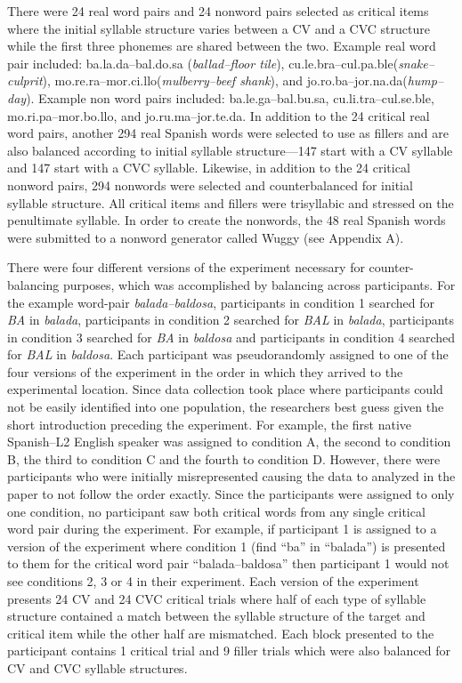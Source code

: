 \documentclass[
12pt, %
english, %
doublespacing, %
nolistspacing, %
liststotoc, %
headsepline, %
chapterinoneline, %
openany, %
]{DoctoralThesis}\usepackage[]{graphicx}\usepackage[]{color}
\begin{document}
There were 24 real word pairs and 24 nonword pairs selected as critical items where the initial syllable structure varies between a CV and a CVC structure while the first three phonemes are shared between the two. Example real word pair included: ba.la.da–bal.do.sa (\emph{ballad–floor tile}), cu.le.bra–cul.pa.ble(\emph{snake–culprit}), mo.re.ra–mor.ci.llo(\emph{mulberry–beef shank}), and jo.ro.ba–jor.na.da(\emph{hump–day}). Example non word pairs included: ba.le.ga–bal.bu.sa, cu.li.tra–cul.se.ble, mo.ri.pa–mor.bo.llo, and jo.ru.ma–jor.te.da. In addition to the 24 critical real word pairs, another 294 real Spanish words were selected to use as fillers and are also balanced according to initial syllable structure—147 start with a CV syllable and 147 start with a CVC syllable. Likewise, in addition to the 24 critical nonword pairs, 294 nonwords were selected and counterbalanced for initial syllable structure. All critical items and fillers were trisyllabic and stressed on the penultimate syllable. In order to create the nonwords, the 48 real Spanish words were submitted to a nonword generator called Wuggy (see Appendix A). %

There were four different versions of the experiment necessary for counter-balancing purposes, which was accomplished by balancing across participants. For the example word-pair \emph{balada–baldosa}, participants in condition 1 searched for \emph{BA} in \emph{balada}, participants in condition 2 searched for \emph{BAL} in \emph{balada}, participants in condition 3 searched for \emph{BA} in \emph{baldosa} and participants in condition 4 searched for \emph{BAL} in \emph{baldosa}. Each participant was pseudorandomly assigned to one of the four versions of the experiment in the order in which they arrived to the experimental location. Since data collection took place where participants could not be easily identified into one population, the researchers best guess given the short introduction preceding the experiment. For example, the first native Spanish–L2 English speaker was assigned to condition A, the second to condition B, the third to condition C and the fourth to condition D. However, there were participants who were initially misrepresented causing the data to analyzed in the paper to not follow the order exactly. Since the participants were assigned to only one condition, no participant saw both critical words from any single critical word pair during the experiment. For example, if participant 1 is assigned to a version of the experiment where condition 1 (find “ba” in “balada”) is presented to them for the critical word pair “balada–baldosa” then participant 1 would not see conditions 2, 3 or 4 in their experiment. Each version of the experiment presents 24 CV and 24 CVC critical trials where half of each type of syllable structure contained a match between the syllable structure of the target and critical item while the other half are mismatched. Each block presented to the participant contains 1 critical trial and 9 filler trials which were also balanced for CV and CVC syllable structures.
\end{document}
